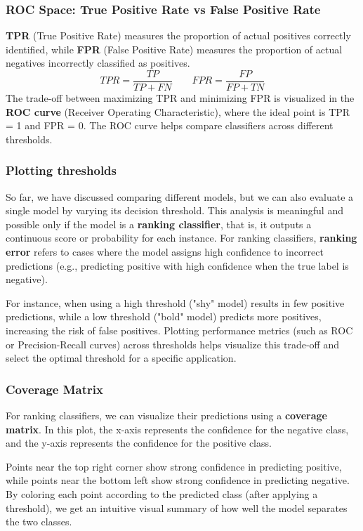 \subsubsection{ROC Space: True Positive Rate vs False Positive Rate}
\textbf{TPR} (True Positive Rate) measures the proportion of actual positives correctly identified, while \textbf{FPR} (False Positive Rate) measures the proportion of actual negatives incorrectly classified as positives.
\[
    TPR = \frac{TP}{TP + FN} \quad\quad FPR = \frac{FP}{FP + TN}
\]
The trade-off between maximizing TPR and minimizing FPR is visualized in the \textbf{ROC curve} (Receiver Operating Characteristic), where the ideal point is TPR = 1 and FPR = 0.
The ROC curve helps compare classifiers across different thresholds.

\subsubsection{Plotting thresholds}
So far, we have discussed comparing different models, but we can also evaluate a single model by varying its decision threshold.
This analysis is meaningful and possible only if the model is a \textbf{ranking classifier}, that is, it outputs a continuous score or probability for each instance.
For ranking classifiers, \textbf{ranking error} refers to cases where the model assigns high confidence to incorrect predictions (e.g., predicting positive with high confidence when the true label is negative).

For instance, when using a high threshold ("shy" model) results in few positive predictions, while a low threshold ("bold" model) predicts more positives, increasing the risk of false positives.
Plotting performance metrics (such as ROC or Precision-Recall curves) across thresholds helps visualize this trade-off and select the optimal threshold for a specific application.

\subsubsection{Coverage Matrix} %
For ranking classifiers, we can visualize their predictions using a \textbf{coverage matrix}.
In this plot, the x-axis represents the confidence for the negative class, and the y-axis represents the confidence for the positive class.

Points near the top right corner show strong confidence in predicting positive, while points near the bottom left show strong confidence in predicting negative.
By coloring each point according to the predicted class (after applying a threshold), we get an intuitive visual summary of how well the model separates the two classes.

